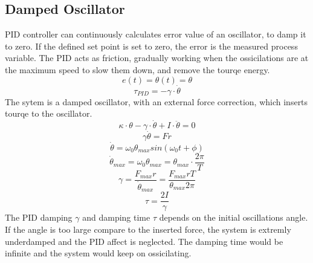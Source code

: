 \documentclass[\main/master.tex]{subfiles}
\begin{document}
\subsection{Damped Oscillator}
PID controller can continuously calculates error value of an oscillator, to damp it to zero. If the defined set point is set to zero, the error is the measured process variable. The PID acts as friction, gradually working when the ossicilations are at the maximum speed to slow them down, and remove the tourqe energy.
\begin{equation}
e(t) = \theta(t) = \theta   \label{eqn:error}
\end{equation}
\begin{equation}
\tau_{PID} = -\gamma\cdot\dot{\theta}   \label{eqn:friction_tourqe}
\end{equation}
The sytem is a damped oscillator, with an external force correction, which inserts tourqe to the oscillator.
\begin{equation}
\kappa\cdot\theta - \gamma\cdot\dot{\theta}  + I\cdot\ddot{\theta} = 0   \label{eqn:damped__pid_motion_equation}
\end{equation}
\begin{equation}
\gamma\dot{\theta}  = Fr   \label{eqn:damped__pid_motion_equation}
\end{equation}
\begin{equation}
\dot{\theta} = \omega_0\theta_{max}sin(\omega_0 t +\phi)    \label{eqn:undamped_motion_equation}
\end{equation}
\begin{equation}
\dot{\theta}_{max} = \omega_0\theta_{max} = \theta_{max}\cdot\frac{2\pi}{T}    \label{eqn:undamped_motion_equation}
\end{equation}
\begin{equation}
\gamma  = \frac{F_{max}r}{\dot{\theta}_{max}} =\frac{F_{max}rT}{\theta_{max}2\pi}    \label{eqn:damped_pid_motion_equation}
\end{equation}
\begin{equation}
\tau =  \frac{2I}{\gamma}  \label{eqn:damping_time}
\end{equation}
The PID damping $\gamma$ and damping time $\tau$ depends on the initial oscillations angle. If the angle is too large compare to the inserted force, the system is extremly underdamped and the PID affect is neglected. The damping time would be infinite and the system would keep on ossicilating.
\end{document}
